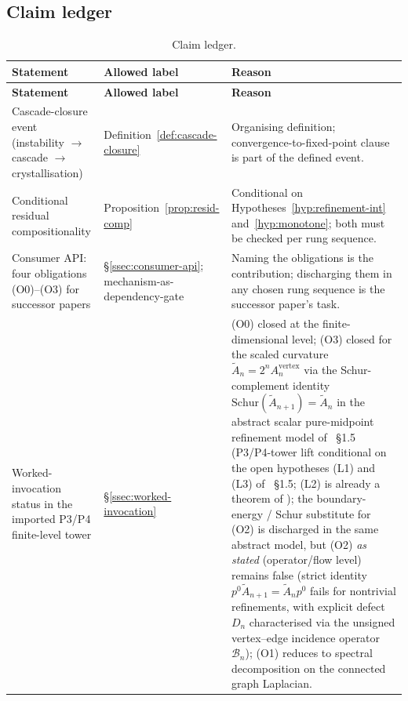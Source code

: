 \documentclass[11pt]{article}
\theoremstyle{definition}
\begin{document}
\subsection{Claim ledger}\label{ssec:claim-ledger}

\renewcommand{\arraystretch}{1.20}
\begin{longtable}{>{\raggedright\arraybackslash}p{}>{\raggedright\arraybackslash}p{}>{\raggedright\arraybackslash}p{}}
\caption{Claim ledger.}\label{tab:claim-ledger}\\
\toprule
\textbf{Statement} & \textbf{Allowed label} & \textbf{Reason} \\
\midrule
\endfirsthead
\toprule
\textbf{Statement} & \textbf{Allowed label} & \textbf{Reason} \\
\midrule
\endhead
Cascade-closure event (instability $\to$ cascade $\to$ crystallisation)
& Definition~\ref{def:cascade-closure}
& Organising definition; convergence-to-fixed-point clause is part of the defined event. \\
Conditional residual compositionality
& Proposition~\ref{prop:resid-comp}
& Conditional on Hypotheses~\ref{hyp:refinement-int} and~\ref{hyp:monotone}; both must be checked per rung sequence. \\
Consumer API: four obligations (O0)--(O3) for successor papers
& \S\ref{ssec:consumer-api}; mechanism-as-dependency-gate
& Naming the obligations is the contribution; discharging them in any chosen rung sequence is the successor paper's task. \\
Worked-invocation status in the imported P3/P4 finite-level tower
& \S\ref{ssec:worked-invocation}
& (O0) closed at the finite-dimensional level; (O3) closed for the scaled curvature $\widetilde A_n = 2^n A_n^{\mathrm{vertex}}$ via the Schur-complement identity $\mathrm{Schur}(\widetilde A_{n+1}) = \widetilde A_n$ in the abstract scalar pure-midpoint refinement model of \cite{CascadeRefinementCompat}~\S1.5 (P3/P4-tower lift conditional on the open hypotheses (L1) and (L3) of \cite{CascadeRefinementCompat}~\S1.5; (L2) is already a theorem of \cite{CascadeRefinementSpaces}); the boundary-energy / Schur substitute for (O2) is discharged in the same abstract model, but (O2) \emph{as stated} (operator/flow level) remains false (strict identity $p^{0} \widetilde A_{n+1} = \widetilde A_n p^{0}$ fails for nontrivial refinements, with explicit defect $D_n$ characterised via the unsigned vertex--edge incidence operator $\mathcal{B}_n$); (O1) reduces to spectral decomposition on the connected graph Laplacian. \\

\end{longtable}
\end{document}
